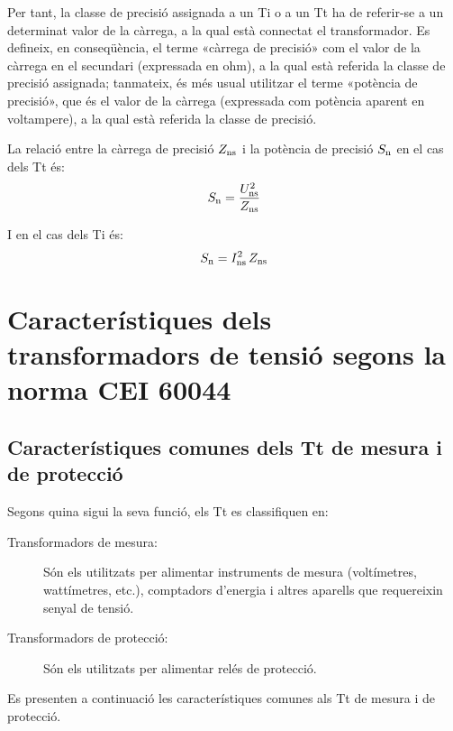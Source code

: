 Per tant, la classe de precisió assignada a un Ti o a un Tt ha de
referir-se a un determinat valor de la càrrega, a la qual està
connectat el transformador. Es defineix, en conseqüència, el terme
«càrrega de precisió» com el valor de la càrrega en el secundari
(expressada en ohm), a la qual està referida la classe de precisió
assignada; tanmateix, és més usual  utilitzar el terme «potència
de precisió», que és el valor de la càrrega (expressada com potència
aparent en voltampere),
 a la qual està referida la classe de precisió.

La relació entre la càrrega de precisió $Z_\mathrm{ns}$ i la potència de
precisió $S_\mathrm{n}$ en el cas dels Tt és:
\begin{equation}
    S_\mathrm{n} = \frac{U_\mathrm{ns}^2}{Z_\mathrm{ns}}
\end{equation}

I en el cas dels Ti és:
\begin{equation}\label{eq:sn_ti}
    S_\mathrm{n} = I_\mathrm{ns}^2 \,Z_\mathrm{ns}
\end{equation}


\section{Característiques dels transformadors de tensió segons la norma CEI 60044}

\subsection{Característiques comunes dels Tt de mesura i de protecció}

Segons quina sigui la seva funció, els Tt es classifiquen en:
\begin{description}
   \item [\hspace{5mm}Transformadors de mesura:] Són els utilitzats per alimentar
            instruments de mesura (voltímetres, wattímetres, etc.),
            comptadors d'energia i altres aparells que requereixin senyal de tensió.
   \item [\hspace{5mm}Transformadors de protecció:] Són els utilitzats per
   alimentar relés de protecció.
\end{description}

Es presenten a continuació les característiques comunes als Tt de
mesura i de protecció.

